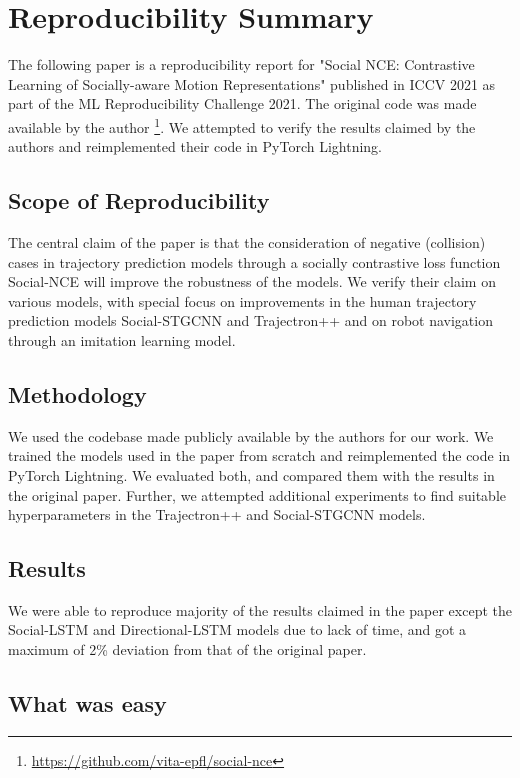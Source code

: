 \vspace{-4em}
\section*{\centering Reproducibility Summary}
The following paper is a reproducibility report for "Social NCE: Contrastive Learning of Socially-aware Motion Representations" {\cite{liu2020snce}} published in ICCV 2021 as part of the ML Reproducibility Challenge 2021. The original code was made available by the author \footnote{\href{https://github.com/vita-epfl/social-nce}{https://github.com/vita-epfl/social-nce}}. We attempted to verify the results claimed by the authors and reimplemented their code in PyTorch Lightning.


\subsection*{Scope of Reproducibility}

The central claim of the paper is that the consideration of negative (collision) cases in trajectory prediction models through a socially contrastive loss function Social-NCE will improve the robustness of the models. We verify their claim on various models, with special focus on improvements in the human trajectory prediction models Social-STGCNN and Trajectron++ and on robot navigation through an imitation learning model. 

\subsection*{Methodology}

We used the codebase made publicly available by the authors for our work. We trained the models used in the paper from scratch and reimplemented the code in PyTorch Lightning. We evaluated both, and compared them with the results in the original paper. Further, we attempted additional experiments to find suitable hyperparameters in the Trajectron++ and Social-STGCNN models.

\subsection*{Results}

We were able to reproduce majority of the results claimed in the paper except the Social-LSTM and Directional-LSTM models due to lack of time, and got a maximum of 2\% deviation from that of the original paper. 
\subsection*{What was easy}

